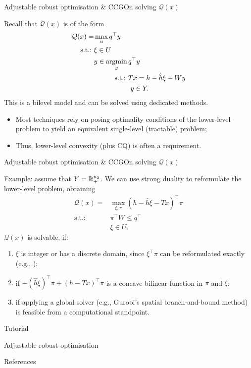 \begin{frame}{Adjustable robust optimisation \& CCG}{On solving $\mathcal{Q}(x)$}

	Recall that $\mathcal{Q}(x)$  is of the form
	\begin{align*}
	\mathcal{Q}(x)	 = &\max_u q^\top y    \\
	   \st &\xi \in U  \\ 	 
		   &y \in \argmin_y q^\top y \\
	       &\qquad \quad \text{s.t.:~} Tx = h - \hat{h} \xi - Wy \\
	       &\qquad \quad \phantom{~\text{s.t.:~}} y \in Y. 
	\end{align*}
	\pause
	This is a \alert{bilevel model} and can be solved using dedicated methods.
	\vspace{-6pt}
	\begin{itemize}
		\item Most techniques rely on \alert{posing optimality conditions} of the lower-level problem to yield an \alert{equivalent single-level} (tractable) problem;
		\item Thus, \alert{lower-level convexity} (plus CQ) is often a requirement.
	\end{itemize}

\end{frame}


\begin{frame}{Adjustable robust optimisation \& CCG}{On solving $\mathcal{Q}(x)$}

	Example: assume that $Y = \mathbb R_+^{n_2}$. We can use strong duality to reformulate the lower-level problem, obtaining
	\begin{align*}
		\mathcal{Q}(x) = &\max_{\xi,\pi} (h - \hat{h} \xi - Tx)^\top \pi \\
		   \text{s.t.:~} & \pi^\top W \leq q^\top \\
		   	   & \xi \in U.	 
	\end{align*}
	\pause
	$\mathcal{Q}(x)$ is solvable, if:
	\vspace{-6pt} 
	\begin{enumerate}
		\item $\xi$ is integer or has a discrete domain, since $\xi^\top \pi$ can be reformulated exactly (e.g., {\small \cite{rintamaki2023achieving}});
		\item if $-(\hat{h}\xi)^\top \pi + (h - Tx)^\top \pi$ is a \alert{concave bilinear} function in $\pi$ and $\xi$;
		\item if applying a \alert{global solver} (e.g., Gurobi's spatial branch-and-bound method) is feasible from a computational standpoint.	
	\end{enumerate}

	
\end{frame}

\begin{frame}{Tutorial}

\centering
\bf
\large

Adjustable robust optimisation
	
\end{frame}


\begin{frame}[allowframebreaks]{References}
	
	
\end{frame}

